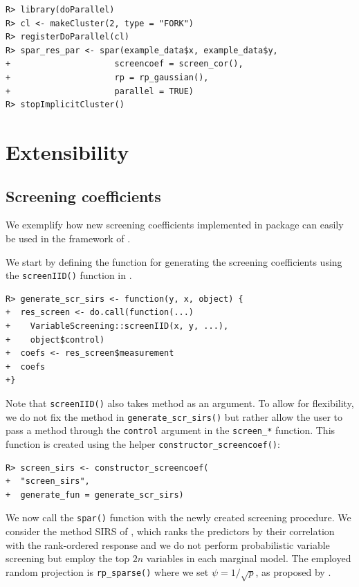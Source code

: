 \documentclass[
  article,
  nojss]{jss}
\begin{document}
\begin{verbatim}
R> library(doParallel)
R> cl <- makeCluster(2, type = "FORK")
R> registerDoParallel(cl)
R> spar_res_par <- spar(example_data$x, example_data$y, 
+                     screencoef = screen_cor(), 
+                     rp = rp_gaussian(),
+                     parallel = TRUE)
R> stopImplicitCluster()
\end{verbatim}

\section{Extensibility}\label{sec-extensibility}

\subsection{Screening coefficients}\label{sec-extensscrcoef}

We exemplify how new screening coefficients implemented in package
 can easily be used in the framework of
.

We start by defining the function for generating the screening
coefficients using the \texttt{screenIID()} function in
.

\begin{verbatim}
R> generate_scr_sirs <- function(y, x, object) {
+  res_screen <- do.call(function(...) 
+    VariableScreening::screenIID(x, y, ...), 
+    object$control)
+  coefs <- res_screen$measurement
+  coefs
+}
\end{verbatim}

Note that \texttt{screenIID()} also takes method as an argument. To
allow for flexibility, we do not fix the method in
\texttt{generate\_scr\_sirs()} but rather allow the user to pass a
method through the \texttt{control} argument in the \texttt{screen\_*}
function. This function is created using the helper
\texttt{constructor\_screencoef()}:

\begin{verbatim}
R> screen_sirs <- constructor_screencoef(
+  "screen_sirs", 
+  generate_fun = generate_scr_sirs)
\end{verbatim}

We now call the \texttt{spar()} function with the newly created
screening procedure. We consider the method SIRS of
\citet{zhu2011model}, which ranks the predictors by their correlation
with the rank-ordered response and we do not perform probabilistic
variable screening but employ the top \(2n\) variables in each marginal
model. The employed random projection is \texttt{rp\_sparse()} where we
set \(\psi=1/\sqrt{p}\), as proposed by
\citet{LiHastie2006VerySparseRP}.
\end{document}
